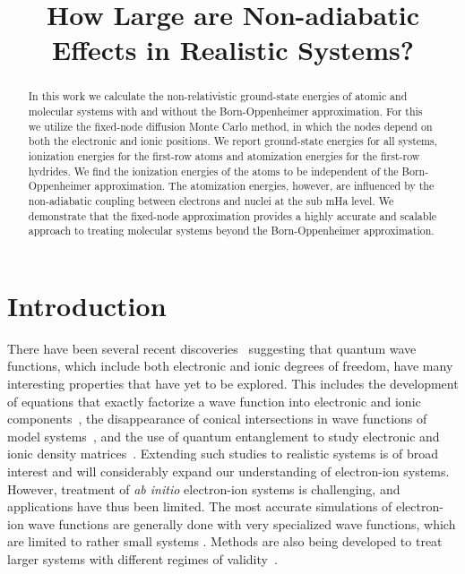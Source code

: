\documentclass[pra,superscriptaddress,groupedaddress,twocolumn]{revtex4}
\begin{document}
\title{How Large are Non-adiabatic Effects in Realistic Systems?}

\begin{abstract}
In this work we calculate the non-relativistic ground-state energies of atomic and molecular systems with and without the Born-Oppenheimer approximation. For this we utilize the fixed-node diffusion Monte Carlo method, in which the nodes depend on both the electronic and ionic positions. We report ground-state energies for all systems, ionization energies for the first-row atoms and atomization energies for the first-row hydrides. We find the ionization energies of the atoms to be independent of the Born-Oppenheimer approximation. The atomization energies, however, are influenced by the non-adiabatic coupling between electrons and nuclei at the sub mHa level. We demonstrate that the fixed-node approximation provides a highly accurate and scalable approach to treating molecular systems beyond the Born-Oppenheimer approximation.
\end{abstract}
\maketitle

\section{Introduction}
There have been several recent discoveries~\cite{Tubman_ECG,cederbaum1,gross2014,boent,Martinez_Review} suggesting that quantum wave functions, which include both electronic and ionic degrees of freedom, have many interesting properties that have yet to be explored.  This includes the development of equations that exactly factorize a wave function into electronic and ionic components~\cite{cederbaum1}, the disappearance of conical intersections in wave functions of model systems~\cite{gross2014}, and the use of quantum entanglement to study electronic and ionic density matrices~\cite{boent}. Extending such studies to realistic systems is of broad interest and will considerably expand our understanding of electron-ion systems. However, treatment of \textit{ab initio} electron-ion systems is challenging, and applications have thus been limited. The most accurate simulations of electron-ion wave functions are generally done with very specialized wave functions, which are limited to rather small systems \cite{mitroy2013}. Methods are also being developed to treat larger systems with different regimes of validity~\cite{Sharon_NEO-HF,Sharon_XCNEO-HF1,Sharon_XCNEO-HF2,Sharon_XCNEO-HF,Kurt_XCNEO-HF,Kurt_XCNEO-HF1,Sharon_NEO-DFT,Sharon_NEO-DFT2,Sharon_NEO-DFT3,Gross_NEO-DFT,Gross_NEO-DFT1,Ilkka_Path,Ilkka_Path1,Ilkka_Path2}.
\end{document}
